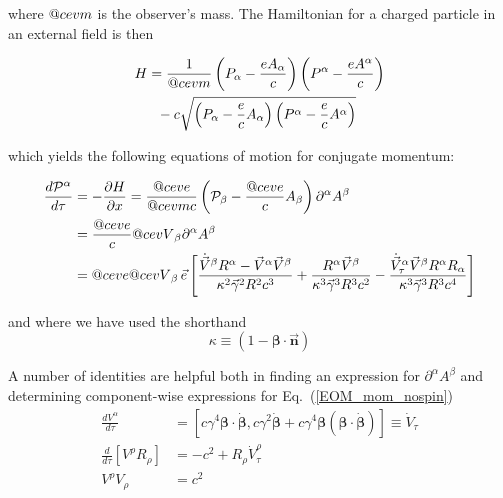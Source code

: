 \documentclass[reprint,
               amsmath,amssymb,nofootinbib, aps%
              ]{revtex4-2}
\makeatletter
\DeclareRobustCommand{\cev}[1]{%
  {\mathpalette\do@cev{#1}}%
}
\newcommand{\do@cev}[2]{%
  \vbox{\offinterlineskip
    \sbox\z@{$\m@th#1 x$}%
    \ialign{##\cr
      \hidewidth\reflectbox{$\m@th#1\vec{}\mkern4mu$}\hidewidth\cr
      \noalign{\kern-\ht\z@}
      $\m@th#1#2$\cr
    }%
  }%
}
\makeatother
\begin{document}
\noindent where $\cev{m}$ is the observer's mass. The Hamiltonian for a charged particle in an external field is then~\cite{jackson2012classical,barut1980electrodynamics}

\begin{align}
    H&=\frac{1}{\cev{m}}\left(P_{\alpha}-\frac{e A_{\alpha}}{c}\right)\left(P^{\alpha}-\frac{e A^{\alpha}}{c}\right)
\nonumber \\
&~~-c \sqrt{\left(P_{\alpha}-\frac{e}{c} A_{\alpha}\right)\left(P^{\alpha}-\frac{e}{c} A^{\alpha}\right)}
\end{align}

\noindent which yields the following equations of motion for conjugate momentum:

\begin{align}
\frac{d\mathcal{P}^\alpha}{d\tau}&= -\frac{\partial H}{\partial x} = \frac{\cev{e}}{\cev{m} c} \left(\mathcal{P}_{\beta}-\frac{\cev{e}}{c} A_{\beta}\right) \partial^{\alpha} A^{\beta}
\nonumber \\
&= \frac{\cev{e}}{c} \cev{V}_{\beta} \partial^{\alpha} A^{\beta}
\nonumber \\
&=\cev{e}\cev{V}_\beta\,\vec{e} \left[
\frac{\dot{\vec{V}}^{\beta
} R^{\alpha} - \vec{V}^\alpha \vec{V}^\beta }{\kappa^{2} \vec{\gamma}^2 R^2 c^{3}}
+\frac{R^\alpha \vec{V}^\beta }{\kappa^3 \vec{\gamma}^3 R^3 c^2} - \frac{ \dot{\vec{V}}^{\alpha}_\tau \vec{V}^{\beta} R^{\alpha} R_{\alpha}}{\kappa^3  \vec{\gamma}^3 R^3 c^4}
\right] \nonumber \\
\label{EOM_mom_nospin}
\end{align}

\noindent and where we have used the shorthand 
\begin{equation*}
\kappa \equiv (1-\boldsymbol{\beta}\cdot \vec{\boldsymbol{n}})
\end{equation*}

A number of identities are helpful both in finding an expression for $\partial^{\alpha} A^{\beta}$ and determining component-wise expressions for Eq.~(\ref{EOM_mom_nospin})~\cite{jackson2012classical,bordovitsyn_technique_2003}
\begin{align}
\frac{d V^{\alpha}}{d \tau}&=\left[c \gamma^{4} \boldsymbol{\beta} \cdot \dot{\boldsymbol{\beta}}, c \gamma^{2} \dot{\boldsymbol{\beta}}+c \gamma^{4} \boldsymbol{\beta}(\boldsymbol{\beta} \cdot \dot{\boldsymbol{\beta}})\right]\equiv \dot{V}_\tau
\nonumber\\
\frac{d}{d\tau} \left[  V^{\rho} R_{\rho} \right] &= -c^2 + R_\rho \dot{V}_\tau^\rho
\nonumber\\
{V}^\rho V_\rho &= c^2
\end{align}
\end{document}
